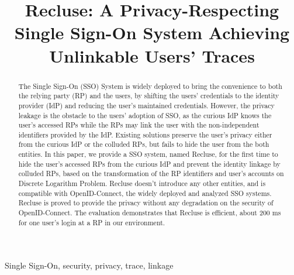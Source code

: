 \documentclass[conference, 10pt]{IEEEtran}
\begin{document}
\title{{Recluse}: A Privacy-Respecting Single Sign-On System Achieving Unlinkable Users' Traces}
%
\maketitle
\begin{abstract}
 The Single Sign-On (SSO) System is widely deployed to bring the convenience to both the relying party (RP) and the users, by shifting the users' credentials to the identity provider (IdP) and reducing the user's maintained  credentials. However, the privacy leakage is the obstacle to the users' adoption of SSO, as the curious IdP knows the user's accessed RPs while the RPs may link the user with the non-independent  identifiers provided by the IdP. Existing solutions preserve the user's privacy either from the curious IdP or the colluded RPs, but fails to hide the user from the both entities. In this paper, we provide a SSO system, named Recluse, for the first time to hide the user's accessed RPs from the curious IdP and prevent the identity linkage by colluded RPs, based on the transformation of the RP identifiers and user's accounts on Discrete Logarithm Problem. Recluse doesn't introduce any other entities, and  is compatible with OpenID-Connect, the widely deployed and analyzed SSO systems. Recluse is proved to provide the privacy without any degradation on the security of OpenID-Connect. The evaluation demonstrates that Recluse is efficient, about 200 ms for one user's login at a RP in our environment.
\end{abstract}
\begin{IEEEkeywords}
Single Sign-On, security, privacy, trace, linkage
\end{IEEEkeywords}















\end{document}
